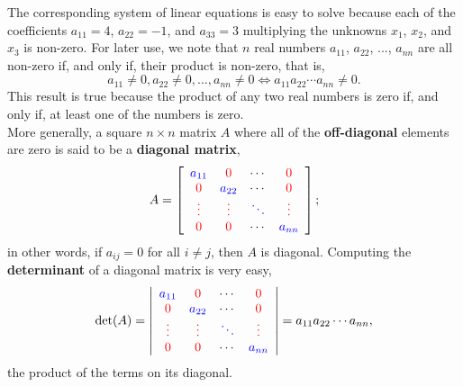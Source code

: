  The corresponding system of linear equations is easy to solve because each of the coefficients $a_{11}=4$, $a_{22}=-1$, and $a_{33}=3$  multiplying the unknowns $x_1$, $x_2$, and $x_3$ is non-zero. For later use, we note that $n$ real numbers  $a_{11}$, $a_{22}$, ..., $a_{nn}$ are all non-zero if, and only if, their product is non-zero, that is,  
 $$ a_{11}\neq 0, a_{22} \neq 0, \ldots, a_{nn} \neq 0 \iff  a_{11} a_{22} \cdots  a_{nn} \neq 0.$$
This result is true because the product of any two real numbers is zero if, and only if, at least one of the numbers is zero.\\

More generally, a square $n \times n$ matrix $A$ where all of the \textbf{off-diagonal} elements are zero is said to be a \textbf{diagonal matrix},
    $$A=\left[\begin{array}{cccc} \color{blue} a_{11} & \color{red} 0 & \cdots & \color{red} 0\\
\color{red} 0& \color{blue} a_{22} & \cdots & \color{red} 0 \\ \color{red} \vdots & \color{red} \vdots & \color{blue} \ddots& \color{red} \vdots \\
\color{red} 0 & \color{red} 0 & \cdots & \color{blue} a_{nn}\\\end{array}\right];$$
in other words, if $a_{ij}=0$ for all $i \neq j$, then $A$ is diagonal. Computing the \textbf{determinant} of a diagonal matrix is very easy, 
$$\det(A) = \left|\begin{array}{cccc} \color{blue} a_{11} & \color{red} 0 & \cdots & \color{red} 0\\
\color{red} 0& \color{blue} a_{22} & \cdots & \color{red} 0 \\ \color{red} \vdots & \color{red} \vdots & \color{blue} \ddots& \color{red} \vdots \\
\color{red} 0 & \color{red} 0 & \cdots & \color{blue} a_{nn}\\\end{array}\right| = a_{11} a_{22} \cdots a_{nn},$$
the product of the terms on its diagonal.\\


